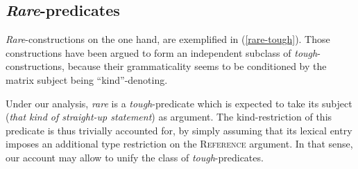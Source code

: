 \documentclass[11pt]{article}
\begin{document}
	 \subsection{\textit{Rare}-predicates}
	 \textit{Rare}-constructions on the one hand, are exemplified in (\ref{rare-tough}). Those constructions have been argued to form an independent subclass of \textit{tough}-constructions, because their grammaticality seems to be conditioned by the matrix subject being ``kind''-denoting.
	\begin{exe}
		 \label{rare-tough}
	\end{exe}
	Under our analysis, \textit{rare} is a \textit{tough}-predicate which is expected to take its subject (\textit{that kind of straight-up statement}) as argument. The kind-restriction of this predicate is thus trivially accounted for, by simply assuming that its lexical entry imposes an additional type restriction on the \textsc{Reference} argument. In that sense, our account may allow to unify the class of \textit{tough}-predicates.
\end{document}
